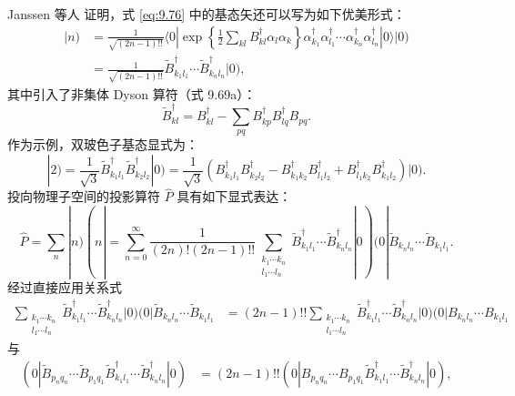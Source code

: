 Janssen 等人 \cite{JDF71} 证明，式 \ref{eq:9.76} 中的基态矢还可以写为如下优美形式：
\begin{align}
|n) & =\frac{1}{\sqrt{(2n-1)!!}}\langle0|\exp\left\{ \frac{1}{2}\sum_{kl}B^{\dagger}_{kl}\alpha_{l}\alpha_{k}\right\} \alpha^{\dagger}_{k_{1}}\alpha^{\dagger}_{l_{1}}\cdots\alpha^{\dagger}_{k_{n}}\alpha^{\dagger}_{l_{n}}|0\rangle|0)\label{eq:9.77}\\
 & =\frac{1}{\sqrt{(2n-1)!!}}\tilde{B}^{\dagger}_{k_{1}l_{1}}\cdots\tilde{B}^{\dagger}_{k_{n}l_{n}}|0),\label{eq:9.78}
\end{align}
其中引入了非集体 Dyson 算符（式 9.69a）：
\begin{equation}
\tilde{B}^{\dagger}_{kl}=B^{\dagger}_{kl}-\sum_{pq}B^{\dagger}_{kp}B^{\dagger}_{lq}B_{pq}.\label{eq:9.79}
\end{equation}
作为示例，双玻色子基态显式为：
\begin{equation}
|2)=\frac{1}{\sqrt{3}}\tilde{B}^{\dagger}_{k_{1}l_{1}}\tilde{B}^{\dagger}_{k_{2}l_{2}}|0)=\frac{1}{\sqrt{3}}\left(B^{\dagger}_{k_{1}l_{1}}B^{\dagger}_{k_{2}l_{2}}-B^{\dagger}_{k_{1}k_{2}}B^{\dagger}_{l_{1}l_{2}}+B^{\dagger}_{l_{1}k_{2}}B^{\dagger}_{k_{1}l_{2}}\right)|0).\label{eq:9.80}
\end{equation}
投向物理子空间的投影算符 $\hat{P}$ 具有如下显式表达：
\begin{equation}
\hat{P}=\sum_{n}|n)(n|=\sum^{\infty}_{n=0}\frac{1}{(2n)!(2n-1)!!}\sum_{\substack{k_{1}\cdots k_{n}\\
l_{1}\cdots l_{n}
}
}\tilde{B}^{\dagger}_{k_{1}l_{1}}\cdots\tilde{B}^{\dagger}_{k_{n}l_{n}}|0)(0|\tilde{B}_{k_{n}l_{n}}\cdots\tilde{B}_{k_{1}l_{1}}.\label{eq:9.81}
\end{equation}
经过直接应用关系式
\begin{align}
\sum_{\substack{k_{1}\cdots k_{n}\\
l_{1}\cdots l_{n}
}
}\tilde{B}^{\dagger}_{k_{1}l_{1}}\cdots\tilde{B}^{\dagger}_{k_{n}l_{n}}|0)(0|\tilde{B}_{k_{n}l_{n}}\cdots\tilde{B}_{k_{1}l_{1}} & =(2n-1)!!\sum_{\substack{k_{1}\cdots k_{n}\\
l_{1}\cdots l_{n}
}
}\tilde{B}^{\dagger}_{k_{1}l_{1}}\cdots\tilde{B}^{\dagger}_{k_{n}l_{n}}|0)(0|B_{k_{n}l_{n}}\cdots B_{k_{1}l_{1}}\label{eq:9.82}
\end{align}
与
\begin{align}
(0|\tilde{B}_{p_{n}q_{n}}\cdots\tilde{B}_{p_{1}q_{1}}\tilde{B}^{\dagger}_{k_{1}l_{1}}\cdots\tilde{B}^{\dagger}_{k_{n}l_{n}}|0) & =(2n-1)!!(0|B_{p_{n}q_{n}}\cdots B_{p_{1}q_{1}}\tilde{B}^{\dagger}_{k_{1}l_{1}}\cdots\tilde{B}^{\dagger}_{k_{n}l_{n}}|0),\label{eq:9.83}
\end{align}
